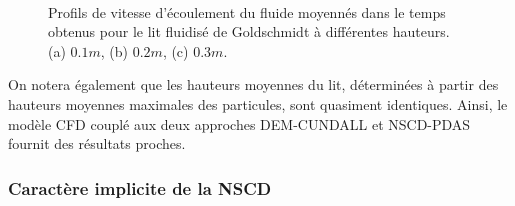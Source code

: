 \begin{figure}[h!]
\hspace{\fill}
\hspace{\fill}
   \\
\caption{\label{v_g_avg_data-profile}Profils de vitesse d'écoulement du fluide moyennés dans le temps obtenus pour le lit fluidisé de Goldschmidt à différentes hauteurs. (a) $0.1 m$, (b) $0.2 m$, (c) $0.3 m$.}
\end{figure}

On notera également que les hauteurs moyennes du lit, déterminées à partir des hauteurs moyennes maximales des particules, sont quasiment identiques. Ainsi, le modèle CFD couplé aux deux approches DEM-CUNDALL et NSCD-PDAS fournit des résultats proches.

\subsubsection{Caractère implicite de la NSCD}

